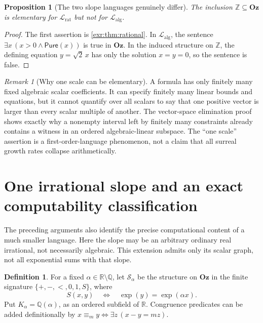 \documentclass[11pt,letterpaper]{article}
\numberwithin{equation}{section}
\newtheorem{proposition}[proposition]{Proposition}
\theoremstyle{definition}
\newtheorem{definition}[definition]{Definition}
\theoremstyle{remark}
\newtheorem{remark}[remark]{Remark}
\newcommand{\Oz}{\mathbf{Oz}}
\newcommand{\Z}{\mathbb Z}
\newcommand{\Q}{\mathbb Q}
\newcommand{\R}{\mathbb R}
\newcommand{\Lrat}{\mathcal L_{\mathrm{rat}}}
\newcommand{\Lalg}{\mathcal L_{\mathrm{alg}}}
\newcommand{\Pure}{\mathsf{Pure}}
\begin{document}
\begin{proposition}[The two slope languages genuinely differ]\label{exr:prop:difference}
The inclusion $\Z\subseteq\Oz$ is elementary for $\Lrat$ but not for $\Lalg$.
\end{proposition}
\begin{proof}
The first assertion is \cref{exr:thm:rational}. In $\Lalg$, the sentence
$\exists x\,(x>0\land\Pure(x))$ is true in $\Oz$. In the induced structure on
$\Z$, the defining equation $y=\sqrt2\,x$ has only the solution $x=y=0$, so the
sentence is false.
\end{proof}

\begin{remark}[Why one scale can be elementary]
A formula has only finitely many fixed algebraic scalar coefficients. It can
specify finitely many linear bounds and equations, but it cannot quantify over
all scalars to say that one positive vector is larger than every scalar multiple
of another. The vector-space elimination proof shows exactly why a nonempty
interval left by finitely many constraints already contains a witness in an
ordered algebraic-linear subspace. The ``one scale'' assertion is a
first-order-language phenomenon, not a claim that all surreal growth rates
collapse arithmetically.
\end{remark}


\section{One irrational slope and an exact computability classification}\label{exr:sec:single}
The preceding arguments also identify the precise computational content of a
much smaller language. Here the slope may be an arbitrary ordinary real
irrational, not necessarily algebraic. This extension admits only its scalar
graph, not all exponential sums with that slope.

\begin{definition}
For a fixed $\alpha\in\R\setminus\Q$, let $\mathcal S_\alpha$ be the structure
on $\Oz$ in the finite signature $\{+,-,<,0,1,S\}$, where
\begin{equation}\label{exr:eq:Salpha}
 S(x,y)\quad\Longleftrightarrow\quad
 \exp(y)=\exp(\alpha x).
\end{equation}
Put $K_\alpha=\Q(\alpha)$, as an ordered subfield of $\R$.
Congruence predicates can be added definitionally by
$x\equiv_m y\Longleftrightarrow\exists z\,(x-y=mz)$.
\end{definition}
\end{document}
